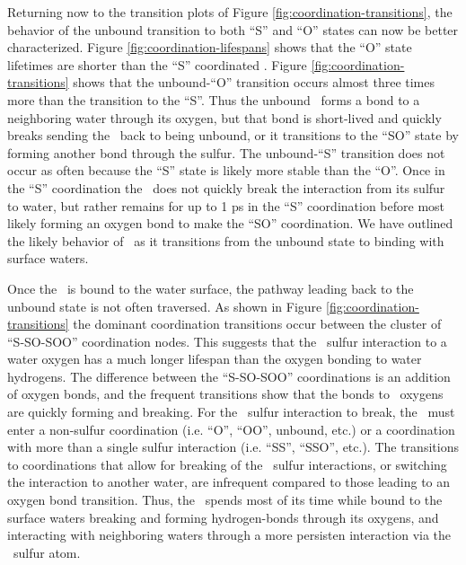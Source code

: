 Returning now to the transition plots of Figure \ref{fig:coordination-transitions}, the behavior of the unbound transition to both ``S'' and ``O'' states can now be better characterized. Figure \ref{fig:coordination-lifespans} shows that the ``O'' state lifetimes are shorter than the ``S'' coordinated \suldiox. Figure \ref{fig:coordination-transitions} shows that the unbound-``O'' transition occurs almost three times more than the transition to the ``S''. Thus the unbound \suldiox~forms a bond to a neighboring water through its oxygen, but that bond is short-lived and quickly breaks sending the \suldiox~back to being unbound, or it transitions to the ``SO'' state by forming another bond through the sulfur. The unbound-``S'' transition does not occur as often because the ``S'' state is likely more stable than the ``O''. Once in the ``S'' coordination the \suldiox~does not quickly break the interaction from its sulfur to water, but rather remains for up to 1 ps in the ``S'' coordination before most likely forming an oxygen bond to make the ``SO'' coordination. We have outlined the likely behavior of \suldiox~as it transitions from the unbound state to binding with surface waters.

Once the \suldiox~is bound to the water surface, the pathway leading back to the unbound state is not often traversed. As shown in Figure \ref{fig:coordination-transitions} the dominant coordination transitions occur between the cluster of ``S-SO-SOO'' coordination nodes. This suggests that the \suldiox~sulfur interaction to a water oxygen has a much longer lifespan than the oxygen bonding to water hydrogens. The difference between the ``S-SO-SOO'' coordinations is an addition of oxygen bonds, and the frequent transitions show that the bonds to \suldiox~oxygens are quickly forming and breaking. For the \suldiox~sulfur interaction to break, the \suldiox~must enter a non-sulfur coordination (i.e. ``O'', ``OO'', unbound, etc.) or a coordination with more than a single sulfur interaction (i.e. ``SS'', ``SSO'', etc.). The transitions to coordinations that allow for breaking of the \suldiox~sulfur interactions, or switching the interaction to another water, are infrequent compared to those leading to an oxygen bond transition. Thus, the \suldiox~spends most of its time while bound to the surface waters breaking and forming hydrogen-bonds through its oxygens, and interacting with neighboring waters through a more persisten interaction via the \suldiox~sulfur atom.
